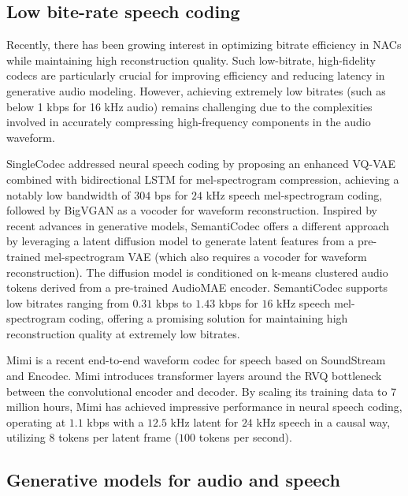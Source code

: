 \documentclass{article} %
\begin{document}
\subsection{Low bite-rate speech coding}

Recently, there has been growing interest \citep{li2024, liu2024, moshi} in optimizing bitrate efficiency in NACs while maintaining high reconstruction quality. Such low-bitrate, high-fidelity codecs are particularly crucial for improving efficiency and reducing latency in generative audio modeling. However, achieving extremely low bitrates (such as below 1 kbps for 16 kHz audio) remains challenging due to the complexities involved in accurately compressing high-frequency components in the audio waveform. 

SingleCodec \citep{li2024} addressed neural speech coding by proposing an enhanced VQ-VAE combined with bidirectional LSTM for mel-spectrogram compression, achieving a notably low bandwidth of $304$ bps for $24$ kHz speech mel-spectrogram coding, followed by BigVGAN \citep{bigvgan} as a vocoder for waveform reconstruction. Inspired by recent advances in generative models, SemantiCodec \citep{liu2024} offers a different approach by leveraging a latent diffusion model to generate latent features from a pre-trained mel-spectrogram VAE (which also requires a vocoder for waveform reconstruction). The diffusion model is conditioned on k-means clustered audio tokens derived from a pre-trained AudioMAE encoder. %
SemantiCodec supports low bitrates ranging from $0.31$ kbps to $1.43$ kbps for $16$ kHz speech mel-spectrogram coding, offering a promising solution for maintaining high reconstruction quality at extremely low bitrates. 

Mimi \citep{moshi} is a recent end-to-end waveform codec for speech based on SoundStream and Encodec. %
Mimi introduces transformer layers around the RVQ bottleneck between the convolutional encoder and decoder. By scaling its training data to $7$ million hours, Mimi has achieved impressive performance in neural speech coding, operating at $1.1$ kbps with a $12.5$ kHz latent for $24$ kHz speech in a causal way, utilizing $8$ tokens per latent frame ($100$ tokens per second).

\subsection{Generative models for audio and speech}
\end{document}
